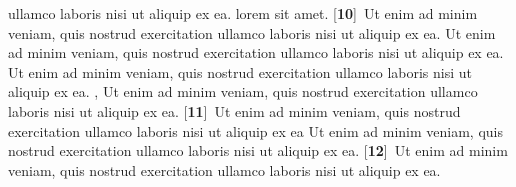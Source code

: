 \documentclass[10pt, twoside]{book}
\newcommand{\bv}[1]{\linenumannotation{#1}[\textbf{#1}]}
\begin{document}
ullamco laboris nisi ut aliquip ex ea.  lorem sit amet. \bv{10}~Ut enim ad minim veniam, quis nostrud exercitation ullamco laboris nisi ut aliquip ex ea. Ut enim ad minim veniam, quis nostrud exercitation ullamco laboris nisi ut aliquip ex ea. Ut enim ad minim veniam, quis nostrud exercitation ullamco laboris nisi ut aliquip ex ea. , Ut enim ad minim veniam, quis nostrud exercitation ullamco laboris nisi ut aliquip ex ea. \bv{11}~Ut enim ad minim veniam, quis nostrud exercitation ullamco laboris nisi ut aliquip ex ea  Ut enim ad minim veniam, quis nostrud exercitation ullamco laboris nisi ut aliquip ex ea. \bv{12}~Ut enim ad minim veniam, quis nostrud exercitation ullamco laboris nisi ut aliquip ex ea.
\pend
\endnumbering
\end{document}
